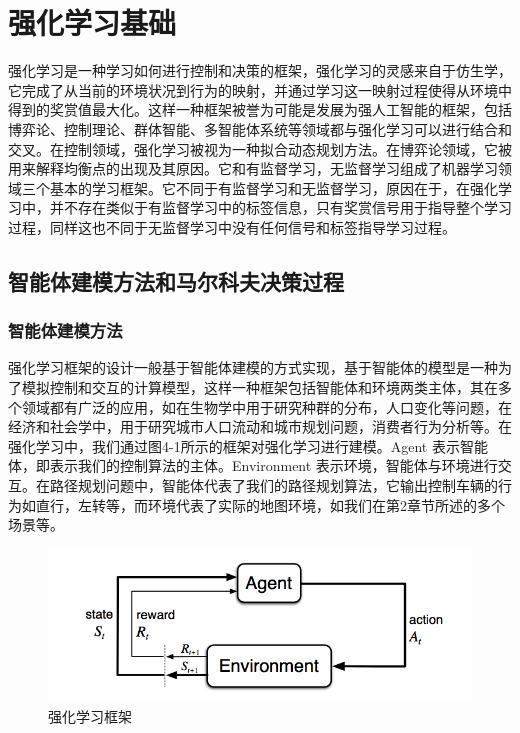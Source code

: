 \documentclass{standalone}
\begin{document}
\chapter{强化学习基础}

强化学习是一种学习如何进行控制和决策的框架，强化学习的灵感来自于仿生学，它完成了从当前的环境状况到行为的映射，并通过学习这一映射过程使得从环境中得到的奖赏值最大化。这样一种框架被誉为可能是发展为强人工智能的框架，包括博弈论、控制理论、群体智能、多智能体系统等领域都与强化学习可以进行结合和交叉。在控制领域，强化学习被视为一种拟合动态规划方法。在博弈论领域，它被用来解释均衡点的出现及其原因。它和有监督学习，无监督学习组成了机器学习领域三个基本的学习框架。它不同于有监督学习和无监督学习，原因在于，在强化学习中，并不存在类似于有监督学习中的标签信息，只有奖赏信号用于指导整个学习过程，同样这也不同于无监督学习中没有任何信号和标签指导学习过程。\par

\section{智能体建模方法和马尔科夫决策过程}
\subsection{智能体建模方法}
强化学习框架的设计一般基于智能体建模的方式实现，基于智能体的模型是一种为了模拟控制和交互的计算模型，这样一种框架包括智能体和环境两类主体，其在多个领域都有广泛的应用，如在生物学中用于研究种群的分布，人口变化等问题，在经济和社会学中，用于研究城市人口流动和城市规划问题，消费者行为分析等。在强化学习中，我们通过图4-1所示的框架对强化学习进行建模。Agent 表示智能体，即表示我们的控制算法的主体。Environment 表示环境，智能体与环境进行交互。在路径规划问题中，智能体代表了我们的路径规划算法，它输出控制车辆的行为如直行，左转等，而环境代表了实际的地图环境，如我们在第2章节所述的多个场景等。
\begin{figure}[h]
	\includegraphics[width=12.0cm]{pic/4-1.png}
	\caption{强化学习框架}
	\label{4-1}
\end{figure}
\end{document}
